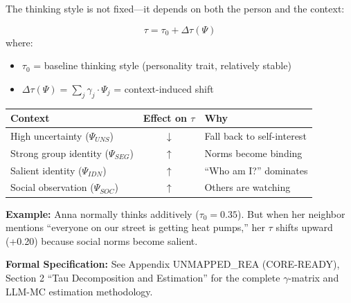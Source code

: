 The thinking style is not fixed---it depends on both the person and the context:

\begin{definition}
\begin{equation}
\tau = \tau_0 + \Delta\tau(\Psi)
\label{eq:tau-decomposition}
\end{equation}
where:
\begin{itemize}[nosep]
\item $\tau_0$ = baseline thinking style (personality trait, relatively stable)
\item $\Delta\tau(\Psi) = \sum_j \gamma_j \cdot \Psi_j$ = context-induced shift
\end{itemize}
\end{definition}

\begin{intuition}
\begin{center}
\begin{tabular}{lcp{6cm}}
\toprule
\textbf{Context} & \textbf{Effect on $\tau$} & \textbf{Why}\\
\midrule
High uncertainty ($\Psi_{UNS}$) & $\downarrow$ & Fall back to self-interest\\
Strong group identity ($\Psi_{SEG}$) & $\uparrow$ & Norms become binding\\
Salient identity ($\Psi_{IDN}$) & $\uparrow$ & ``Who am I?'' dominates\\
Social observation ($\Psi_{SOC}$) & $\uparrow$ & Others are watching\\
\bottomrule
\end{tabular}
\end{center}

\textbf{Example:} Anna normally thinks additively ($\tau_0 = 0.35$). But when
her neighbor mentions ``everyone on our street is getting heat pumps,'' her
$\tau$ shifts upward (+0.20) because social norms become salient.
\end{intuition}

\begin{cross-reference}
\textbf{Formal Specification:} See Appendix UNMAPPED_REA (CORE-READY), Section 2 ``Tau Decomposition
and Estimation'' for the complete $\gamma$-matrix and LLM-MC estimation methodology.
\end{cross-reference}



